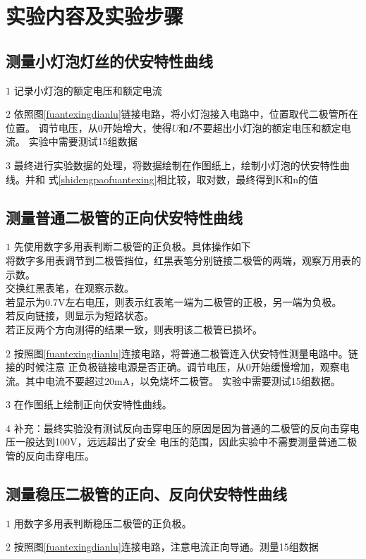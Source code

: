 \documentclass{ctexart}
\begin{document}
\section{实验内容及实验步骤}
  \subsection{测量小灯泡灯丝的伏安特性曲线}
  \(1\) 记录小灯泡的额定电压和额定电流

  \(2\) 依照图\ref{fuantexingdianlu}链接电路，将小灯泡接入电路中，位置取代二极管所在位置。
        调节电压，从0开始增大，使得$U\mbox{和}I$不要超出小灯泡的额定电压和额定电流。
        实验中需要测试15组数据

  \(3\) 最终进行实验数据的处理，将数据绘制在作图纸上，绘制小灯泡的伏安特性曲线。并和
        式\ref{shidengpaofuantexing}相比较，取对数，最终得到K和n的值

  \subsection{测量普通二极管的正向伏安特性曲线}
  \(1\) 先使用数字多用表判断二极管的正负极。具体操作如下\\
  将数字多用表调节到二极管挡位，红黑表笔分别链接二极管的两端，观察万用表的示数。\\
  交换红黑表笔，在观察示数。\\
  若显示为0.7V左右电压，则表示红表笔一端为二极管的正极，另一端为负极。\\
  若反向链接，则显示为短路状态。\\
  若正反两个方向测得的结果一致，则表明该二极管已损坏。

  \(2\) 按照图\ref{fuantexingdianlu}连接电路，将普通二极管连入伏安特性测量电路中。链接的时候注意
        正负极链接电源是否正确。调节电压，从0开始缓慢增加，观察电流。其中电流不要超过20mA，以免烧坏二极管。
        实验中需要测试15组数据。

  \(3\) 在作图纸上绘制正向伏安特性曲线。

  \(4\) 补充：最终实验没有测试反向击穿电压的原因是因为普通的二极管的反向击穿电压一般达到100V，远远超出了安全
        电压的范围，因此实验中不需要测量普通二极管的反向击穿电压。

  \subsection{测量稳压二极管的正向、反向伏安特性曲线}
  \(1\) 用数字多用表判断稳压二极管的正负极。
  
  \(2\) 按照图\ref{fuantexingdianlu}连接电路，注意电流正向导通。测量15组数据
\end{document}
